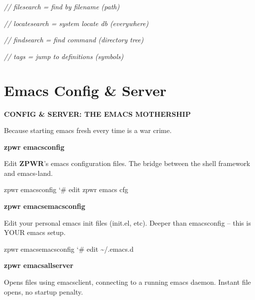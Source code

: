 \documentclass[11pt,a4paper,twoside]{book}
\begin{document}
{\small\itshape\color{dimtext} //   filesearch  = find by filename (path)}

{\small\itshape\color{dimtext} //   locatesearch = system locate db (everywhere)}

{\small\itshape\color{dimtext} //   findsearch  = find command (directory tree)}

{\small\itshape\color{dimtext} //   tags        = jump to definitions (symbols)}


\vspace{16pt}

\section{Emacs Config \& Server}


\vspace{10pt}
{\large\bfseries\color{neoncyan} CONFIG \& SERVER: THE EMACS MOTHERSHIP}\vspace{6pt}

Because starting emacs fresh every time is a war crime.


\vspace{12pt}
{\bfseries\color{neonyellow} zpwr emacsconfig}\vspace{4pt}

Edit \textbf{ZPWR}'s emacs configuration files. The bridge between the shell framework and emacs-land.

\begin{codebox}
\color{neongreen}zpwr emacsconfig            {\char`\#} edit zpwr emacs cfg\\
\end{codebox}


\vspace{12pt}
{\bfseries\color{neonyellow} zpwr emacsemacsconfig}\vspace{4pt}

Edit your personal emacs init files (init.el, etc). Deeper than emacsconfig -- this is YOUR emacs setup.

\begin{codebox}
\color{neongreen}zpwr emacsemacsconfig       {\char`\#} edit \textasciitilde{}/.emacs.d\\
\end{codebox}


\vspace{12pt}
{\bfseries\color{neonyellow} zpwr emacsallserver}\vspace{4pt}

Opens files using emacsclient, connecting to a running emacs daemon. Instant file opens, no startup penalty.
\end{document}
